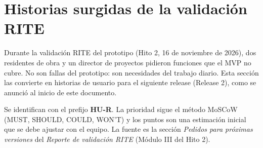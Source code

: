 \documentclass[11pt]{article}
\newcommand{\etiqueta}[1]{\colorbox{barra}{\textbf{\color{marca}#1}}}
\begin{document}
\newcommand{\historia}[9]{%
  \newpage
  \section*{#1: #2}
  \addcontentsline{toc}{section}{#1: #2}
  \etiqueta{#3}\quad\etiqueta{#4 puntos}\quad Origen: validación RITE del Hito 2

  \begin{tabular}{>{\bfseries}p{2.4cm} p{13.4cm}}
  \toprule
  Módulo & #5 \\
  \bottomrule
  \end{tabular}

  \subsection*{Descripción de la historia de usuario}

  \begin{tabular}{>{\bfseries}p{2.4cm} p{13.4cm}}
  \toprule
  Como & #6 \\
  Quiero & #7 \\
  Para & #8 \\
  \bottomrule
  \end{tabular}

  \subsection*{Criterios de aceptación}

  \begin{enumerate}
  #9
  \end{enumerate}}

\newpage
\section{Historias surgidas de la validación RITE}

Durante la validación RITE del prototipo (Hito 2, 16 de noviembre de 2026), dos residentes de obra y un director de proyectos pidieron funciones que el MVP no cubre. No son fallas del prototipo: son necesidades del trabajo diario. Esta sección las convierte en historias de usuario para el siguiente release (Release 2), como se anunció al inicio de este documento.

Se identifican con el prefijo \textbf{HU-R}. La prioridad sigue el método MoSCoW (MUST, SHOULD, COULD, WON'T) y los puntos son una estimación inicial que se debe ajustar con el equipo. La fuente es la sección \emph{Pedidos para próximas versiones} del \emph{Reporte de validación RITE} (Módulo III del Hito 2).
\end{document}
